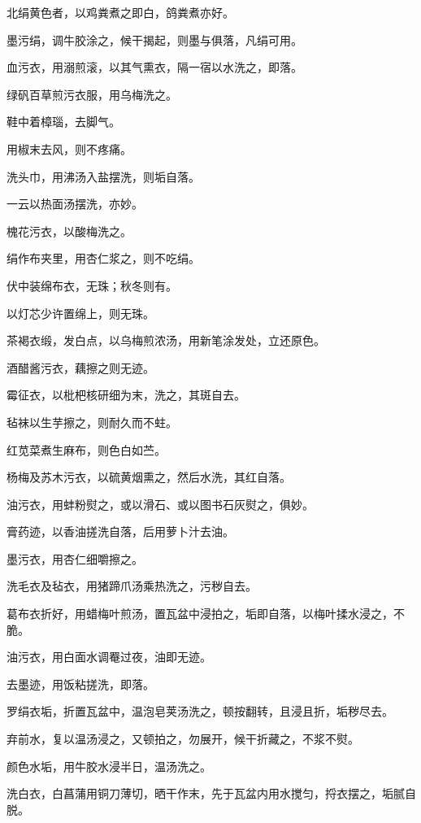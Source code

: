 \documentclass[a4paper,12pt,UTF8,twoside]{ctexbook}
\begin{document}
    北绢黄色者，以鸡粪煮之即白，鸽粪煮亦好。
    
    墨污绢，调牛胶涂之，候干揭起，则墨与俱落，凡绢可用。
    
    血污衣，用溺煎滚，以其气熏衣，隔一宿以水洗之，即落。
    
    绿矾百草煎污衣服，用乌梅洗之。
    
    鞋中着樟瑙，去脚气。
    
    用椒末去风，则不疼痛。
    
    洗头巾，用沸汤入盐摆洗，则垢自落。
    
    一云以热面汤摆洗，亦妙。
    
    槐花污衣，以酸梅洗之。
    
    绢作布夹里，用杏仁浆之，则不吃绢。
    
    伏中装绵布衣，无珠；秋冬则有。
    
    以灯芯少许置绵上，则无珠。
    
    茶褐衣缎，发白点，以乌梅煎浓汤，用新笔涂发处，立还原色。
    
    酒醋酱污衣，藕擦之则无迹。
    
    霉征衣，以枇杷核研细为末，洗之，其斑自去。
    
    毡袜以生芋擦之，则耐久而不蛀。
    
    红苋菜煮生麻布，则色白如苎。
    
    杨梅及苏木污衣，以硫黄烟熏之，然后水洗，其红自落。
    
    油污衣，用蚌粉熨之，或以滑石、或以图书石灰熨之，俱妙。
    
    膏药迹，以香油搓洗自落，后用萝卜汁去油。
    
    墨污衣，用杏仁细嚼擦之。
    
    洗毛衣及毡衣，用猪蹄爪汤乘热洗之，污秽自去。
    
    葛布衣折好，用蜡梅叶煎汤，置瓦盆中浸拍之，垢即自落，以梅叶揉水浸之，不脆。
    
    油污衣，用白面水调罨过夜，油即无迹。
    
    去墨迹，用饭粘搓洗，即落。
    
    罗绢衣垢，折置瓦盆中，温泡皂荚汤洗之，顿按翻转，且浸且折，垢秽尽去。
    
    弃前水，复以温汤浸之，又顿拍之，勿展开，候干折藏之，不浆不熨。
    
    颜色水垢，用牛胶水浸半日，温汤洗之。
    
    洗白衣，白菖蒲用铜刀薄切，晒干作末，先于瓦盆内用水搅匀，捋衣摆之，垢腻自脱。
    
\end{document}
